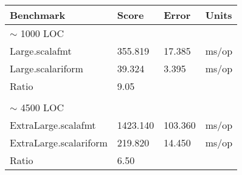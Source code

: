 \begin{tabular}{llll}
  Benchmark              &     Score &     Error &  Units\\
  \hline
  \hline
  $\sim$ 1000 LOC \\
  Large.scalafmt         &   355.819 &  17.385  &  ms/op\\
  Large.scalariform      &    39.324 &    3.395 &  ms/op\\
\hline
  Ratio            &   9.05   &  & \\
  \\
  $\sim$ 4500 LOC \\
  ExtraLarge.scalafmt    &  1423.140 &  103.360 &  ms/op\\
  ExtraLarge.scalariform &   219.820 &   14.450 &  ms/op\\
\hline
  Ratio            &   6.50   &  & \\
\end{tabular}
